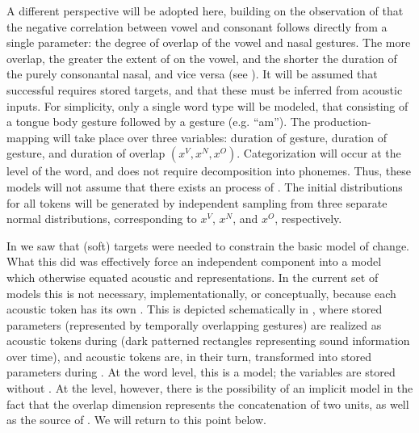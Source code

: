 A different perspective will be adopted here, building on the observation
of \citet{Beddor2009} that the negative correlation between vowel
 and consonant  follows directly from a single 
parameter: the degree of overlap of the vowel and nasal gestures.
The more overlap, the greater the extent of  on the vowel,
and the shorter the duration of the purely consonantal nasal, and
vice versa (see ). It will be assumed
that successful  requires stored  targets, and
that these must be inferred from acoustic inputs. For simplicity,
only a single word type will be modeled, that consisting of a tongue
body gesture followed by a  gesture (e.g. “am”). The production-
mapping will take place over three  variables: duration of
 gesture, duration of  gesture, and duration of 
overlap $(x^{V},x^{N},x^{O})$. Categorization will occur at the level
of the word, and does not require decomposition into phonemes. Thus,
these models will not assume that there exists an  process
of . The initial distributions for all tokens will
be generated by independent sampling from three separate normal distributions,
corresponding to $x^{V}$, $x^{N}$, and $x^{O}$, respectively. 

In  we saw that (soft) targets
were needed to constrain the basic  model of change. What
this did was effectively force an independent  component
into a model which otherwise equated acoustic and  representations.
In the current set of models this is not necessary, implementationally,
or conceptually, because each acoustic token has its own 
. This is depicted schematically in ,
where stored  parameters (represented by temporally overlapping
 gestures) are realized as acoustic tokens during 
(dark patterned rectangles representing sound  information
over time), and acoustic tokens are, in their turn, transformed into
stored  parameters during . At the word level,
this is a  model; the  variables are stored
without . At the  level, however, there is the
possibility of an implicit  model in the fact that the
overlap dimension represents the concatenation of two units, as well
as the source of . We will return to this point below.

